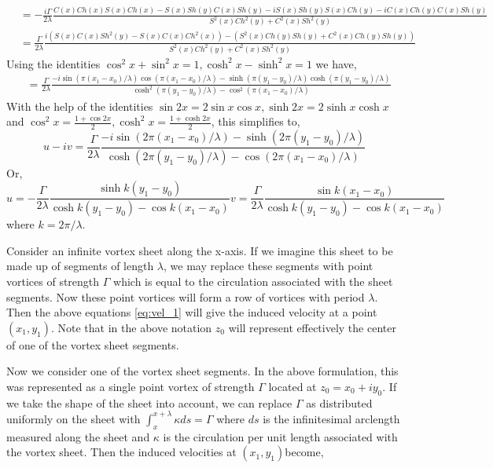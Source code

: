 \documentclass{article}
\begin{document}
\begin{align*}
&= -\frac{i\Gamma}{2\lambda}\frac{C(x)Ch(x)S(x)Ch(x)-S(x)Sh(y)C(x)Sh(y)-iS(x)Sh(y)S(x)Ch(y)-iC(x)Ch(y)C(x)Sh(y)}{S^2(x)Ch^2(y)+C^2(x)Sh^2(y)} \\
&= \frac{\Gamma}{2\lambda} \frac{i(S(x)C(x)Sh^2(y)-S(x)C(x)Ch^2(x))-(S^2(x)Ch(y)Sh(y)+C^2(x)Ch(y)Sh(y))}{S^2(x)Ch^2(y)+C^2(x)Sh^2(y)} 
\end{align*}
Using the identities $\cos^2 x+\sin^2 x=1,\cosh^2 x-\sinh^2 x=1 $ we have,
\begin{align*}
&= \frac{\Gamma}{2\lambda} \frac{-i\sin(\pi(x_1-x_0)/\lambda)\cos(\pi(x_1-x_0)/\lambda)-\sinh(\pi(y_1-y_0)/\lambda)\cosh(\pi(y_1-y_0)/\lambda)}{\cosh^2(\pi(y_1-y_0)/\lambda)-\cos^2(\pi(x_1-x_0)/\lambda)}
\end{align*}
With the help of the identities $\sin{2x}=2\sin{x}\cos{x},\sinh{2x}=2\sinh{x}\cosh{x} $ and $\cos^2 x=\frac{1+\cos{2x}}{2},\cosh^2 x=\frac{1+\cosh{2x}}{2} $, this simplifies to,
\begin{equation*}
u-iv= \frac{\Gamma}{2\lambda} \frac{-i\sin(2\pi(x_1-x_0)/\lambda)-\sinh(2\pi(y_1-y_0)/\lambda)}{\cosh(2\pi(y_1-y_0)/\lambda)-\cos(2\pi(x_1-x_0)/\lambda)}
\end{equation*}
Or,
\begin{subequations}\label{eq:vel_1}
\begin{equation}
u= -\frac{\Gamma}{2\lambda} \frac{\sinh k(y_1-y_0)}{\cosh k(y_1-y_0)-\cos k(x_1-x_0)}
\end{equation}
\begin{equation}
v= \frac{\Gamma}{2\lambda} \frac{\sin k(x_1-x_0)}{\cosh k(y_1-y_0)-\cos k(x_1-x_0)}
\end{equation}
\end{subequations}
where $k=2\pi/\lambda$.

Consider an infinite vortex sheet along the x-axis. If we imagine this sheet to be made up of segments of length $\lambda$, we may replace these segments with point vortices of strength $\Gamma$ which is equal to the circulation associated with the sheet segments. Now these point vortices will form a row of vortices with period $\lambda$. Then the above equations \eqref{eq:vel_1} will give the induced velocity at a point $(x_1,y_1)$. Note that in the above notation $z_0$ will represent effectively the center of one of the vortex sheet segments.

Now we consider one of the vortex sheet segments. In the above formulation, this was represented as a single point vortex of strength $\Gamma$ located at $z_0=x_0+iy_0$. If we take the shape of the sheet into account, we can replace $\Gamma$ as distributed uniformly on the sheet with $\int_x^{x+\lambda}\kappa ds=\Gamma$ where $ds$ is the infinitesimal arclength measured along the sheet and $\kappa$ is the circulation per unit length associated with the vortex sheet. Then the induced velocities at $(x_1,y_1)$become,
\end{document}
